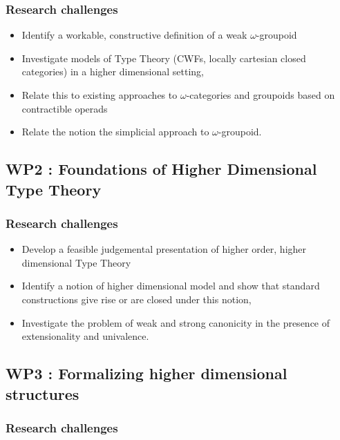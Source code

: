 \documentclass[a4paper]{article}
\begin{document}
\subsubsection*{Research challenges}
\label{sec:rsearch-challenges}
\begin{itemize}
\item Identify a workable, constructive definition of a weak
$\omega$-groupoid

\item Investigate models of Type Theory (CWFs, locally cartesian
  closed categories) in a higher dimensional setting,
\item Relate this to existing approaches to $\omega$-categories and
  groupoids based on contractible operads
\item Relate the notion the simplicial approach to $\omega$-groupoid.
\end{itemize}


\subsection*{WP2 : Foundations of Higher Dimensional Type Theory}

\subsubsection*{Research challenges}
\label{sec:rsearch-challenges}

\begin{itemize}
\item Develop a feasible judgemental presentation of higher order,
  higher dimensional Type Theory

\item Identify a notion of higher dimensional model and show that
  standard constructions give rise or are closed under this notion,

\item Investigate the problem of weak and strong canonicity
  in the presence of extensionality and univalence.
\end{itemize}


\subsection*{WP3 : Formalizing higher dimensional structures} 
\label{sec:wp:qio}

\subsubsection*{Research challenges}
\label{sec:rsearch-challenges}
\end{document}
